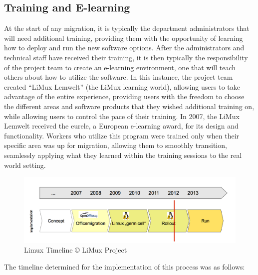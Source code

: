 \subsection{Training and  E-learning }
At the start of any migration, it is typically the department administrators that will need additional training, providing them with the opportunity of learning how to deploy and run the new software options. After the administrators and technical staff have received their training, it is then typically the responsibility of the project team to create an e-learning environment, one that will teach others about how to utilize the software. In this instance, the project team created ``LiMux Lemwelt'' (the LiMux learning world), allowing users to take advantage of the entire experience, providing users with the freedom to choose the different areas and software products that they wished additional training on, while allowing users to control the pace of their training. In 2007, the LiMux Lemwelt received the eurele, a European e-learning award, for its design and functionality. Workers who utilize this program were trained only when their specific area was up for migration, allowing them to smoothly transition, seamlessly applying what they learned within the training sessions to the real world setting.
\begin{figure}[H]
    \includegraphics[scale=0.4]{img/timeline_limux.png}
 \caption  [Limux Timeline]{Limux Timeline © LiMux Project}  
\end{figure}
The timeline determined for the implementation of this process was as follows:

